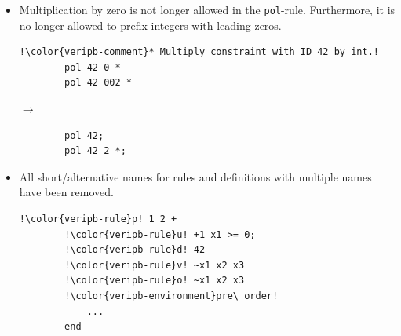 \documentclass[a4paper]{article}
\newcommand{\veriPB}[0]{\textsc{VeriPB}}
\begin{document}
\begin{itemize}
	      \begin{minipage}{.47\linewidth}
		      \begin{lstlisting}[language=veripb, gobble=8, rulecolor=\color{veripb-valid-text}, caption={\veriPB{} 3.0 syntax.}]
		% The line below does NOT add a new ID!
		@label e +1 x1 >= 1;
		\end{lstlisting}
	      \end{minipage}
	\item Multiplication by zero is not longer allowed in the \verb!pol!-rule. Furthermore, it is no longer allowed to prefix integers with leading zeros.
	      \\[1mm]
	      \begin{minipage}{.47\linewidth}
		      \begin{lstlisting}[language=veripb, gobble=8, rulecolor=\color{veripb-invalid-text}, caption={\veriPB{} 2.0 syntax.}]
		!\color{veripb-comment}* Multiply constraint with ID 42 by int.!
		pol 42 0 *
		pol 42 002 *
		\end{lstlisting}
	      \end{minipage}\hfill%
	      \begin{minipage}[t]{.05\linewidth}
		      \centering \vspace*{-5mm}$\to$
	      \end{minipage}\hfill%
	      \hfill%
	      \begin{minipage}{.47\linewidth}
		      \begin{lstlisting}[language=veripb, gobble=8, rulecolor=\color{veripb-valid-text}, caption={\veriPB{} 3.0 syntax.}]
		% Multiply constraint with ID 42 by int.
		pol 42;
		pol 42 2 *;
		\end{lstlisting}
	      \end{minipage}
	\item All short/alternative names for rules and definitions with multiple names have been removed.
	      \\[1mm]
	      \begin{minipage}{.47\linewidth}
		      \begin{lstlisting}[language=veripb, gobble=8, rulecolor=\color{veripb-invalid-text}, caption={\veriPB{} 2.0 syntax.}]
		!\color{veripb-rule}p! 1 2 +
		!\color{veripb-rule}u! +1 x1 >= 0;
		!\color{veripb-rule}d! 42
		!\color{veripb-rule}v! ~x1 x2 x3
		!\color{veripb-rule}o! ~x1 x2 x3
		!\color{veripb-environment}pre\_order!
			...
		end
		\end{lstlisting}
	      \end{minipage}\hfill%

\end{itemize}
\end{document}
